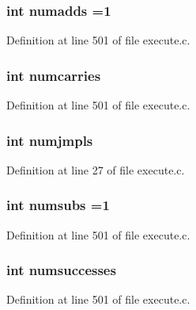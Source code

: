 \subsubsection[{numadds}]{\setlength{\rightskip}{0pt plus 5cm}int numadds =1}\label{execute_8c_a59f5e448d2606c40dcb5eef13b1621bc}


Definition at line 501 of file execute.\+c.

\subsubsection[{numcarries}]{\setlength{\rightskip}{0pt plus 5cm}int numcarries}\label{execute_8c_afd9905d8426741c9d3685b3f16b4a4dc}


Definition at line 501 of file execute.\+c.

\subsubsection[{numjmpls}]{\setlength{\rightskip}{0pt plus 5cm}int numjmpls}\label{execute_8c_a5c795c9d324e98209929e75c3605ebaf}


Definition at line 27 of file execute.\+c.

\subsubsection[{numsubs}]{\setlength{\rightskip}{0pt plus 5cm}int numsubs =1}\label{execute_8c_acd5c8ec5a9d632d17afeacba7bc97366}


Definition at line 501 of file execute.\+c.

\subsubsection[{numsuccesses}]{\setlength{\rightskip}{0pt plus 5cm}int numsuccesses}\label{execute_8c_a2f3f5dcba488f065d38fedba82a2a674}


Definition at line 501 of file execute.\+c.


